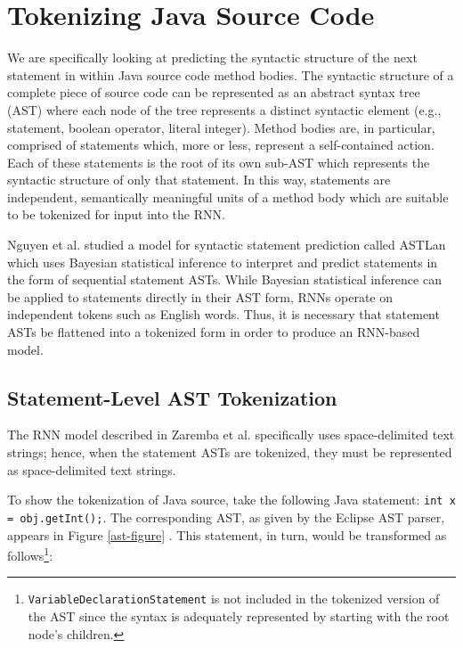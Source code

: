 \documentclass[runningheads,a4paper]{llncs}
\begin{document}


\section{Tokenizing Java Source Code}

We are specifically looking at predicting the syntactic structure  of the next 
statement in within Java source code method bodies. The syntactic structure 
of a complete piece of source code can be represented as an abstract 
syntax tree (AST) where each node of the tree represents a distinct 
syntactic element (e.g., statement, boolean operator, literal integer). 
Method bodies are, in particular, comprised of statements which, more or 
less, represent a self-contained action. Each of these statements is the 
root of its own sub-AST which represents the syntactic structure of only 
that statement. In this way, statements are 
independent, semantically meaningful units of a method body which are suitable 
to be tokenized for input into the RNN.

Nguyen et al. \cite{Nguyen} studied a model for syntactic statement prediction 
called ASTLan which uses Bayesian statistical inference to interpret and 
predict statements in the form of sequential statement ASTs. While Bayesian 
statistical inference can be applied to statements directly in their AST 
form, RNNs operate on independent tokens such as English words. Thus, it is 
necessary that statement ASTs be flattened into a tokenized form in order to 
produce an RNN-based model.

\subsection{Statement-Level AST Tokenization}

The RNN model described in Zaremba et al. \cite{Zaremba} specifically uses space-delimited 
text strings; hence, when the statement ASTs are tokenized, they 
must be represented as space-delimited text strings.

To show the tokenization of Java source, take the following Java statement:
\texttt{int x = obj.getInt();}.
The corresponding AST, as given by the Eclipse AST parser, appears in Figure \ref{ast-figure} \cite{Eclipse}.
This statement, in turn, would be transformed as follows\footnote{
\texttt{VariableDeclarationStatement} is not included in the
tokenized version of the AST since the syntax is adequately represented
by starting with the root node's children.}:
\end{document}
